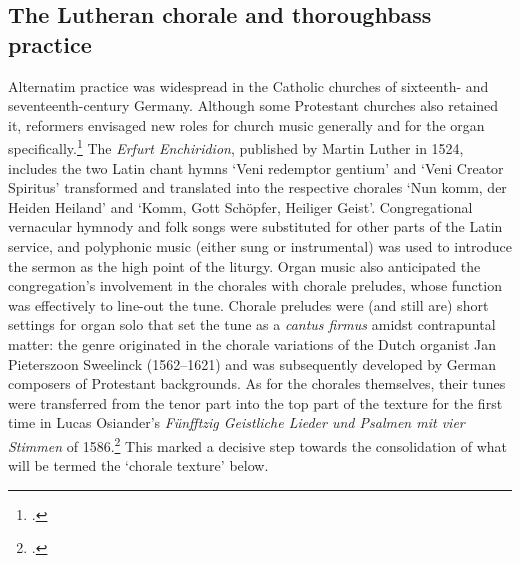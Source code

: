 \subsection{The Lutheran chorale and thoroughbass practice}
Alternatim practice was widespread in the Catholic churches of sixteenth- and seventeenth-century Germany.
Although some Protestant churches also retained it, reformers envisaged new roles for church music generally and for the organ specifically.\footcite[3--31]{SoehnerGeschichteBegleitunggregorianischen1931}
The \emph{Erfurt Enchiridion}, published by Martin Luther in 1524, includes the two Latin chant hymns `Veni redemptor gentium' and `Veni Creator Spiritus' transformed and translated into the respective chorales `Nun komm, der Heiden Heiland' and `Komm, Gott Schöpfer, Heiliger Geist'.
Congregational vernacular hymnody and folk songs were substituted for other parts of the Latin service, and polyphonic music (either sung or instrumental) was used to introduce the sermon as the high point of the liturgy.
Organ music also anticipated the congregation's involvement in the chorales with chorale preludes, whose function was effectively to line-out the tune.
Chorale preludes were (and still are) short settings for organ solo that set the tune as a \emph{cantus firmus} amidst contrapuntal matter: the genre originated in the chorale variations of the Dutch organist Jan Pieterszoon Sweelinck (1562--1621) and was subsequently developed by German composers of Protestant backgrounds.
As for the chorales themselves, their tunes were transferred from the tenor part into the top part of the texture for the first time in Lucas Osiander's \emph{Fünfftzig Geistliche Lieder und Psalmen mit vier Stimmen} of 1586.\footcite[169]{FrenchChorale2003}
This marked a decisive step towards the consolidation of what will be termed the `chorale texture' below.

